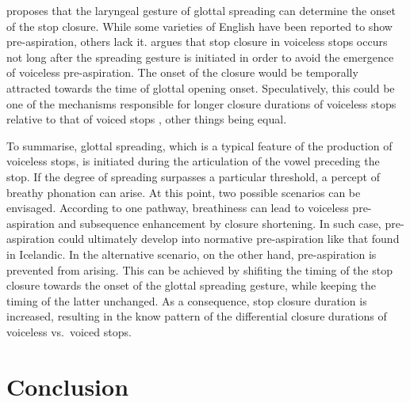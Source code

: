 \documentclass[
  11pt,
  a4paper,
]{article}
\begin{document}
\citet{lisker1974} proposes that the laryngeal gesture of glottal
spreading can determine the onset of the stop closure. While some
varieties of English have been reported to show pre-aspiration, others
lack it. \citeauthor{lisker1974} argues that stop closure in voiceless
stops occurs not long after the spreading gesture is initiated in order
to avoid the emergence of voiceless pre-aspiration. The onset of the
closure would be temporally attracted towards the time of glottal
opening onset. Speculatively, this could be one of the mechanisms
responsible for longer closure durations of voiceless stops relative to
that of voiced stops
\citep{lisker1957, umeda1977, van-summers1987, davis1989, de-jong1991},
other things being equal.

To summarise, glottal spreading, which is a typical feature of the
production of voiceless stops, is initiated during the articulation of
the vowel preceding the stop. If the degree of spreading surpasses a
particular threshold, a percept of breathy phonation can arise. At this
point, two possible scenarios can be envisaged. According to one
pathway, breathiness can lead to voiceless pre-aspiration and
subsequence enhancement by closure shortening. In such case,
pre-aspiration could ultimately develop into normative pre-aspiration
like that found in Icelandic. In the alternative scenario, on the other
hand, pre-aspiration is prevented from arising. This can be achieved by
shifiting the timing of the stop closure towards the onset of the
glottal spreading gesture, while keeping the timing of the latter
unchanged. As a consequence, stop closure duration is increased,
resulting in the know pattern of the differential closure durations of
voiceless vs.~voiced stops.

\hypertarget{conclusion}{%
\section{Conclusion}\label{conclusion}}

\label{s:conclusion}
\end{document}
